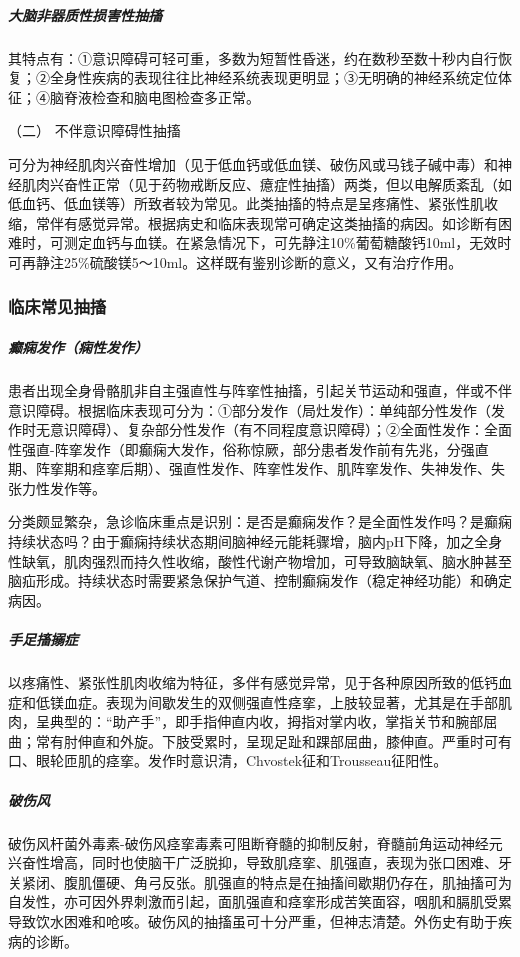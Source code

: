 \subparagraph{大脑非器质性损害性抽搐}

其特点有：①意识障碍可轻可重，多数为短暂性昏迷，约在数秒至数十秒内自行恢复；②全身性疾病的表现往往比神经系统表现更明显；③无明确的神经系统定位体征；④脑脊液检查和脑电图检查多正常。

\hypertarget{text00016.htmlux5cux23CHP1-5-2-2-2}{}
（二） 不伴意识障碍性抽搐

可分为神经肌肉兴奋性增加（见于低血钙或低血镁、破伤风或马钱子碱中毒）和神经肌肉兴奋性正常（见于药物戒断反应、癔症性抽搐）两类，但以电解质紊乱（如低血钙、低血镁等）所致者较为常见。此类抽搐的特点是呈疼痛性、紧张性肌收缩，常伴有感觉异常。根据病史和临床表现常可确定这类抽搐的病因。如诊断有困难时，可测定血钙与血镁。在紧急情况下，可先静注10\%葡萄糖酸钙10ml，无效时可再静注25\%硫酸镁5～10ml。这样既有鉴别诊断的意义，又有治疗作用。

\subsubsection{临床常见抽搐}

\subparagraph{癫痫发作（痫性发作）}

患者出现全身骨骼肌非自主强直性与阵挛性抽搐，引起关节运动和强直，伴或不伴意识障碍。根据临床表现可分为：①部分发作（局灶发作）：单纯部分性发作（发作时无意识障碍）、复杂部分性发作（有不同程度意识障碍）；②全面性发作：全面性强直-阵挛发作（即癫痫大发作，俗称惊厥，部分患者发作前有先兆，分强直期、阵挛期和痉挛后期）、强直性发作、阵挛性发作、肌阵挛发作、失神发作、失张力性发作等。

分类颇显繁杂，急诊临床重点是识别：是否是癫痫发作？是全面性发作吗？是癫痫持续状态吗？由于癫痫持续状态期间脑神经元能耗骤增，脑内pH下降，加之全身性缺氧，肌肉强烈而持久性收缩，酸性代谢产物增加，可导致脑缺氧、脑水肿甚至脑疝形成。持续状态时需要紧急保护气道、控制癫痫发作（稳定神经功能）和确定病因。

\subparagraph{手足搐搦症}

以疼痛性、紧张性肌肉收缩为特征，多伴有感觉异常，见于各种原因所致的低钙血症和低镁血症。表现为间歇发生的双侧强直性痉挛，上肢较显著，尤其是在手部肌肉，呈典型的：“助产手”，即手指伸直内收，拇指对掌内收，掌指关节和腕部屈曲；常有肘伸直和外旋。下肢受累时，呈现足趾和踝部屈曲，膝伸直。严重时可有口、眼轮匝肌的痉挛。发作时意识清，Chvostek征和Trousseau征阳性。

\subparagraph{破伤风}

破伤风杆菌外毒素-破伤风痉挛毒素可阻断脊髓的抑制反射，脊髓前角运动神经元兴奋性增高，同时也使脑干广泛脱抑，导致肌痉挛、肌强直，表现为张口困难、牙关紧闭、腹肌僵硬、角弓反张。肌强直的特点是在抽搐间歇期仍存在，肌抽搐可为自发性，亦可因外界刺激而引起，面肌强直和痉挛形成苦笑面容，咽肌和膈肌受累导致饮水困难和呛咳。破伤风的抽搐虽可十分严重，但神志清楚。外伤史有助于疾病的诊断。

